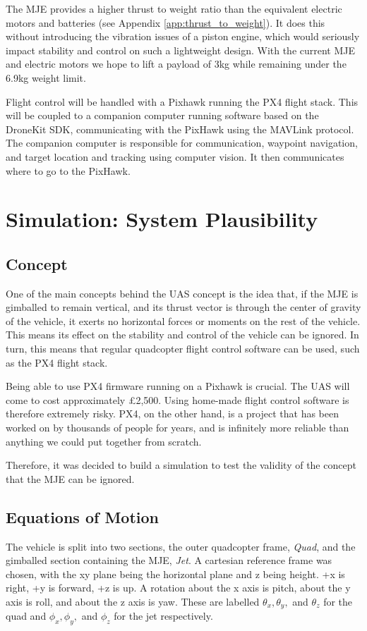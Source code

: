 \documentclass[11pt]{article}
\begin{document}
The MJE provides a higher thrust to weight ratio than the equivalent electric motors and batteries (see Appendix \ref{app:thrust_to_weight}). It does this without introducing the vibration issues of a piston engine, which would seriously impact stability and control on such a lightweight design. With the current MJE and electric motors we hope to lift a payload of 3kg while remaining under the 6.9kg weight limit.

Flight control will be handled with a Pixhawk running the PX4 flight stack. This will be coupled to a companion computer running software based on the DroneKit SDK, communicating with the PixHawk using the MAVLink protocol. The companion computer is responsible for communication, waypoint navigation, and target location and tracking using computer vision. It then communicates where to go to the PixHawk.

\section{Simulation: System Plausibility}
\subsection{Concept}
One of the main concepts behind the UAS concept is the idea that, if the MJE is gimballed to remain vertical, and its thrust vector is through the center of gravity of the vehicle, it exerts no horizontal forces or moments on the rest of the vehicle. This means its effect on the stability and control of the vehicle can be ignored. In turn, this means that regular quadcopter flight control software can be used, such as the PX4 flight stack.

Being able to use PX4 firmware running on a Pixhawk is crucial. The UAS will come to cost approximately \pounds2,500. Using home-made flight control software is therefore extremely risky. PX4, on the other hand, is a project that has been worked on by thousands of people for years, and is infinitely more reliable than anything we could put together from scratch.

Therefore, it was decided to build a simulation to test the validity of the concept that the MJE can be ignored.

\subsection{Equations of Motion}
The vehicle is split into two sections, the outer quadcopter frame, \emph{Quad}, and the gimballed section containing the MJE, \emph{Jet}. A cartesian reference frame was chosen, with the xy plane being the horizontal plane and z being height. +x is right, +y is forward, +z is up. A rotation about the x axis is pitch, about the y axis is roll, and about the z axis is yaw. These are labelled $\theta_x, \theta_y,$ and $\theta_z$ for the quad and $\phi_x, \phi_y,$ and $\phi_z$ for the jet respectively.
\end{document}
